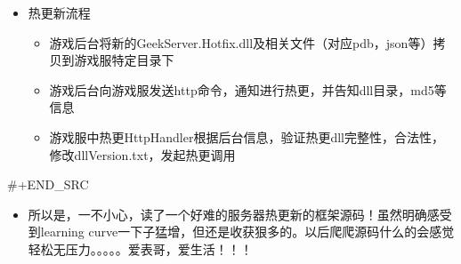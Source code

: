 \documentclass[9pt, b5paper]{article}
\begin{document}
\begin{itemize}
\begin{itemize}
\item 热更新流程
\begin{itemize}
\item 游戏后台将新的GeekServer.Hotfix.dll及相关文件（对应pdb，json等）拷贝到游戏服特定目录下
\item 游戏后台向游戏服发送http命令，通知进行热更，并告知dll目录，md5等信息
\item 游戏服中热更HttpHandler根据后台信息，验证热更dll完整性，合法性，修改dllVersion.txt，发起热更调用
\end{itemize}
\end{itemize}
\end{itemize}
\#+END\_SRC
\begin{itemize}
\item 所以是，一不小心，读了一个好难的服务器热更新的框架源码！虽然明确感受到learning curve一下子猛增，但还是收获狠多的。以后爬爬源码什么的会感觉轻松无压力。。。。。爱表哥，爱生活！！！
\end{itemize}
\end{document}
